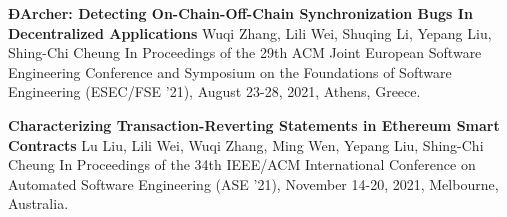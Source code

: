 \begin{scholarship}
	{\textbf{ÐArcher: Detecting On-Chain-Off-Chain Synchronization Bugs In Decentralized Applications}}
	{Wuqi Zhang, Lili Wei, Shuqing Li, Yepang Liu, Shing-Chi Cheung}
	\scholarshipentry{}
	{In Proceedings of the 29th ACM Joint European Software Engineering Conference and Symposium on the Foundations of Software Engineering (ESEC/FSE '21), August 23-28, 2021, Athens, Greece.}

	{\textbf{Characterizing Transaction-Reverting Statements in Ethereum Smart Contracts}}
	{Lu Liu, Lili Wei, Wuqi Zhang, Ming Wen, Yepang Liu, Shing-Chi Cheung}
	\scholarshipentry{}
	{In Proceedings of the 34th IEEE/ACM International Conference on Automated Software Engineering (ASE ’21), November 14-20, 2021, Melbourne, Australia.}

\end{scholarship}
